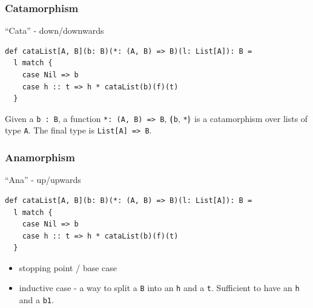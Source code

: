 \documentclass[
  aspectratio=1610, 
  xcolor={dvipsnames},
]{beamer}
\begin{document}
\begin{frame}[fragile]
  \frametitle{Catamorphism}

  ``Cata'' - down/downwards \vspace{3em}

  \pause

  \begin{lstlisting}
def cataList[A, B](b: B)(*: (A, B) => B)(l: List[A]): B =
  l match {
    case Nil => b
    case h :: t => h * cataList(b)(f)(t)
  }
  \end{lstlisting}



  \pause

  Given a \lstinline|b : B|, a function \lstinline|*: (A, B) => B|, \((\mspace{-5mu}|\)\lstinline|b|, \lstinline|*|\(|\mspace{-5mu})\)
  is a catamorphism over lists of type \lstinline|A|. The final type is \lstinline|List[A] => B|.




\end{frame}


\begin{frame}[fragile]
  \frametitle{Anamorphism}

  ``Ana'' - up/upwards \vspace{3em}

  \pause

  \begin{lstlisting}
def cataList[A, B](b: B)(*: (A, B) => B)(l: List[A]): B =
  l match {
    case Nil => b
    case h :: t => h * cataList(b)(f)(t)
  }
  \end{lstlisting}

  \pause
  \begin{itemize}[<+->]
    \item stopping point / base case
    \item inductive case - a way to split a \lstinline|B| into an \lstinline|h|
    and a \lstinline|t|. \pause Sufficient to have an \lstinline|h| and a
    \lstinline|b1|.
  \end{itemize}

\end{frame}
\end{document}
